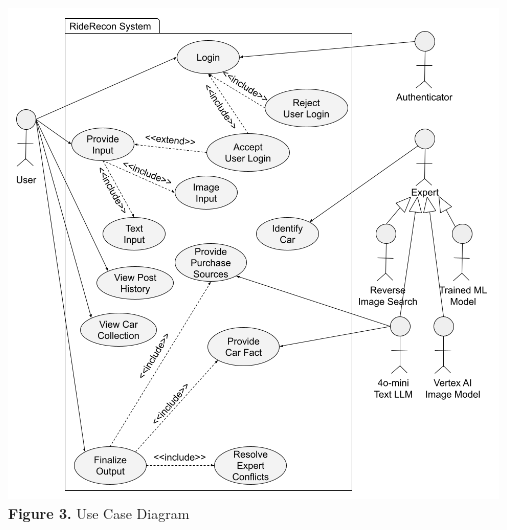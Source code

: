 \documentclass[]{article}
\begin{document}
\begin{center}
\includegraphics[height=13cm]{images/Use Case Diagram D1.png} \\
\textbf{Figure 3. } Use Case Diagram
\end{center}


%
%
%
\end{document}

